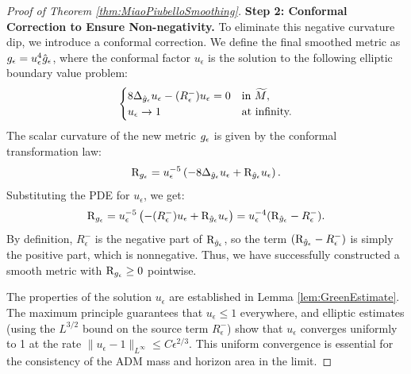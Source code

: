 \begin{proof}[Proof of Theorem \ref{thm:MiaoPiubelloSmoothing}]
\textbf{Step 2: Conformal Correction to Ensure Non-negativity.}
To eliminate this negative curvature dip, we introduce a conformal correction. We define the final smoothed metric as $g_{\epsilon} = u_\epsilon^4 \hat{g}_\epsilon$, where the conformal factor $u_\epsilon$ is the solution to the following elliptic boundary value problem:
\begin{equation}
    \begin{cases}
        8 \Delta_{\hat{g}_\epsilon} u_\epsilon - (R^-_\epsilon) u_\epsilon = 0 & \text{in } \widetilde{M}, \\
        u_\epsilon \to 1 & \text{at infinity.}
    \end{cases}
\end{equation}
The scalar curvature of the new metric $g_{\epsilon}$ is given by the conformal transformation law:
\[ \mathrm{R}_{g_{\epsilon}} = u_\epsilon^{-5} \left( -8\Delta_{\hat{g}_\epsilon}u_\epsilon + \mathrm{R}_{\hat{g}_\epsilon}u_\epsilon \right). \]
Substituting the PDE for $u_\epsilon$, we get:
\[ \mathrm{R}_{g_{\epsilon}} = u_\epsilon^{-5} \left( -(R^-_\epsilon)u_\epsilon + \mathrm{R}_{\hat{g}_\epsilon}u_\epsilon \right) = u_\epsilon^{-4}(\mathrm{R}_{\hat{g}_\epsilon} - R^-_\epsilon). \]
By definition, $R^-_\epsilon$ is the negative part of $\mathrm{R}_{\hat{g}_\epsilon}$, so the term $(\mathrm{R}_{\hat{g}_\epsilon} - R^-_\epsilon)$ is simply the positive part, which is nonnegative. Thus, we have successfully constructed a smooth metric with $\mathrm{R}_{g_{\epsilon}} \ge 0$ pointwise.

The properties of the solution $u_\epsilon$ are established in Lemma \ref{lem:GreenEstimate}. The maximum principle guarantees that $u_\epsilon \le 1$ everywhere, and elliptic estimates (using the $L^{3/2}$ bound on the source term $R^-_\epsilon$) show that $u_\epsilon$ converges uniformly to 1 at the rate $\|u_\epsilon - 1\|_{L^\infty} \le C \epsilon^{2/3}$. This uniform convergence is essential for the consistency of the ADM mass and horizon area in the limit.


\end{proof}
